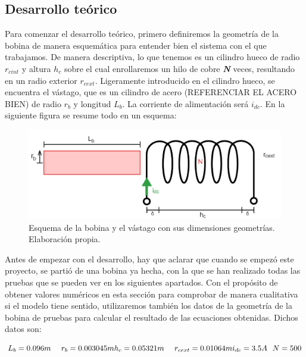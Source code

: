 \subsection{Desarrollo teórico}
\label{subsec:desarrollo}
Para comenzar el desarrollo teórico, primero definiremos la geometría de la bobina de manera esquemática para entender bien el sistema con el que trabajamos. De manera descriptiva, lo que tenemos es un cilindro hueco de radio \( r_{cint} \) y altura \( h_c \) sobre el cual enrollaremos un hilo de cobre \textbf{\textit{N}} veces, resultando en un radio exterior \( r_{cext} \). Ligeramente introducido en el cilindro hueco, se encuentra el vástago, que es un cilindro de acero (REFERENCIAR EL ACERO BIEN) de radio \( r_b \) y longitud \( L_b \). La corriente de alimentación será \( i_{dc} \). En la siguiente figura se resume todo en un esquema:

\begin{figure}[h]
    \centering
    \includegraphics[width=\linewidth]{FigurasMemoria/fig2esquemaGeom.png}
    \caption{Esquema de la bobina y el vástago con sus dimensiones geometrías. Elaboración propia.}
    \label{fig:2} %
\end{figure}

Antes de empezar con el desarrollo, hay que aclarar que cuando se empezó este proyecto, se partió de una bobina ya hecha, con la que se han realizado todas las pruebas que se pueden ver en los siguientes apartados. Con el propósito de obtener valores numéricos en esta sección para comprobar de manera cualitativa si el modelo tiene sentido, utilizaremos también los datos de la geometría de la bobina de pruebas para calcular el resultado de las ecuaciones obtenidas. Dichos datos son:

\[
L_b=0.096m~~~~r_b=0.003045m
\\~\\
h_c=0.05321m~~~~r_{cext}=0.01064m
\\~\\
i_{dc}=3.5A~~N=500
\]

